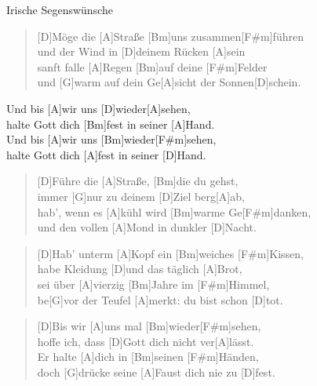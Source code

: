\begin{song}{Irische Segenswünsche}{}

\begin{verse}
    [D]Möge die [A]Straße [Bm]uns zusammen[F#m]führen\\
    [G]und der Wind in [D]deinem Rücken [A]sein\\
    [D]sanft falle [A]Regen [Bm]auf deine [F#m]Felder\\
    und [G]warm auf dein Ge[A]sicht der Sonnen[D]schein.
\end{verse}

\begin{chorus}
    [G]Und bis [A]wir uns [D]wieder[A]sehen,\\
    [D]halte Gott dich [Bm]fest in seiner [A]Hand.\\
    [D]Und bis [A]wir uns [Bm]wieder[F#m]sehen,\\
    [G]halte Gott dich [A]fest in seiner [D]Hand.
\end{chorus}

\begin{verse}
    [D]Führe die [A]Straße, [Bm]die du gehst,\\
    [F#m]immer [G]nur zu deinem [D]Ziel berg[A]ab,\\
    [D]hab', wenn es [A]kühl wird [Bm]warme Ge[F#m]danken,\\
    [G]und den vollen [A]Mond in dunkler [D]Nacht.
\end{verse}


\begin{verse}  
    [D]Hab' unterm [A]Kopf ein [Bm]weiches [F#m]Kissen,\\
    [G]habe Kleidung [D]und das täglich [A]Brot,\\
    [D]sei über [A]vierzig [Bm]Jahre im [F#m]Himmel,\\
    be[G]vor der Teufel [A]merkt: du bist schon [D]tot.
\end{verse}


\begin{verse}
    [D]Bis wir [A]uns mal [Bm]wieder[F#m]sehen,\\
    [G]hoffe ich, dass [D]Gott dich nicht ver[A]lässt.\\
    [D]Er halte [A]dich in [Bm]seinen [F#m]Händen,\\
    doch [G]drücke seine [A]Faust dich nie zu [D]fest.
\end{verse}


\end{song}
